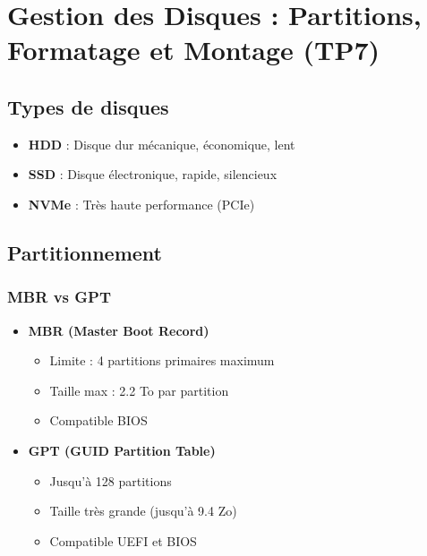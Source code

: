 \documentclass[12pt,a4paper]{article}
\begin{document}

\section{Gestion des Disques : Partitions, Formatage et Montage (TP7)}

\subsection{Types de disques}

\begin{itemize}
    \item \textbf{HDD} : Disque dur mécanique, économique, lent
    \item \textbf{SSD} : Disque électronique, rapide, silencieux
    \item \textbf{NVMe} : Très haute performance (PCIe)
\end{itemize}

\subsection{Partitionnement}

\subsubsection{MBR vs GPT}
\begin{itemize}
    \item \textbf{MBR (Master Boot Record)}
    \begin{itemize}
        \item Limite : 4 partitions primaires maximum
        \item Taille max : 2.2 To par partition
        \item Compatible BIOS
    \end{itemize}
    \item \textbf{GPT (GUID Partition Table)}
    \begin{itemize}
        \item Jusqu'à 128 partitions
        \item Taille très grande (jusqu'à 9.4 Zo)
        \item Compatible UEFI et BIOS
    \end{itemize}
\end{itemize}
\end{document}
